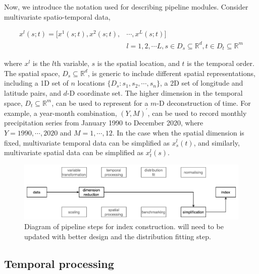 \documentclass[
]{interact}
\begin{document}
Now, we introduce the notation used for describing pipeline modules.
Consider multivariate spatio-temporal data,

\begin{equation}
\begin{aligned}
x^l(s;t) = [x^1(s;t), x^2(s;t), & \cdots, x^L(s;t)] \\
& l = 1, 2, \cdots L, s \in D_s \subseteq \mathbb{R}^d, t \in D_t \subseteq \mathbb{R}^m 
\end{aligned}
\end{equation}

where \(x^l\) is the \(l\)th variable, \(s\) is the spatial location,
and \(t\) is the temporal order. The spatial space,
\(D_s \subseteq \mathbb{R}^d\), is generic to include different spatial
representations, including a 1D set of \(n\) locations
\(\{D_s: s_1, s_2, \cdots, s_n\}\), a 2D set of longitude and latitude
pairs, and \(d\)-D coordinate set. The higher dimension in the temporal
space, \(D_t \subseteq \mathbb{R}^m\), can be used to represent for a
\(m\)-D deconstruction of time. For example, a year-month combination,
\((Y, M)^\prime\), can be used to record monthly precipitation series
from January 1990 to December 2020, where \(Y = 1990, \cdots, 2020\) and
\(M = 1, \cdots, 12\). In the case when the spatial dimension is fixed,
multivariate temporal data can be simplified as \(x^l_s(t)\), and
similarly, multivariate spatial data can be simplified as \(x^l_t(s)\).

\begin{figure}

{\centering \includegraphics[width=1\textwidth,height=0.9\textheight]{figures/pipeline-overall.png}

}

\caption{\label{fig-pipeline-steps}Diagram of pipeline steps for index
construction. will need to be updated with better design and the
distribution fitting step.}

\end{figure}

\hypertarget{temporal-processing}{%
\subsection{Temporal processing}\label{temporal-processing}}
\end{document}
